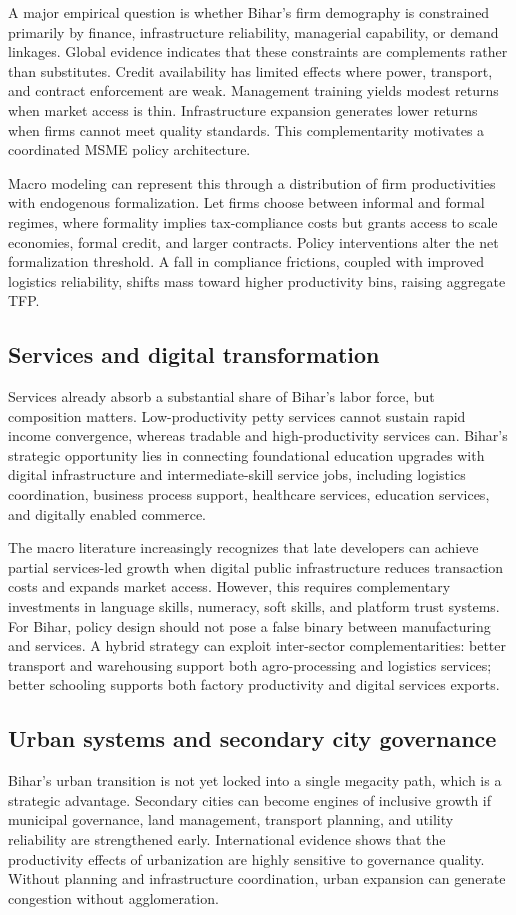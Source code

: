 \documentclass[preprint,12pt]{elsarticle}
\begin{document}
A major empirical question is whether Bihar's firm demography is constrained primarily by finance, infrastructure reliability, managerial capability, or demand linkages. Global evidence indicates that these constraints are complements rather than substitutes. Credit availability has limited effects where power, transport, and contract enforcement are weak. Management training yields modest returns when market access is thin. Infrastructure expansion generates lower returns when firms cannot meet quality standards. This complementarity motivates a coordinated MSME policy architecture.

Macro modeling can represent this through a distribution of firm productivities with endogenous formalization. Let firms choose between informal and formal regimes, where formality implies tax-compliance costs but grants access to scale economies, formal credit, and larger contracts. Policy interventions alter the net formalization threshold. A fall in compliance frictions, coupled with improved logistics reliability, shifts mass toward higher productivity bins, raising aggregate TFP.

\subsection{Services and digital transformation}
Services already absorb a substantial share of Bihar's labor force, but composition matters. Low-productivity petty services cannot sustain rapid income convergence, whereas tradable and high-productivity services can. Bihar's strategic opportunity lies in connecting foundational education upgrades with digital infrastructure and intermediate-skill service jobs, including logistics coordination, business process support, healthcare services, education services, and digitally enabled commerce.

The macro literature increasingly recognizes that late developers can achieve partial services-led growth when digital public infrastructure reduces transaction costs and expands market access. However, this requires complementary investments in language skills, numeracy, soft skills, and platform trust systems. For Bihar, policy design should not pose a false binary between manufacturing and services. A hybrid strategy can exploit inter-sector complementarities: better transport and warehousing support both agro-processing and logistics services; better schooling supports both factory productivity and digital services exports.

\subsection{Urban systems and secondary city governance}
Bihar's urban transition is not yet locked into a single megacity path, which is a strategic advantage. Secondary cities can become engines of inclusive growth if municipal governance, land management, transport planning, and utility reliability are strengthened early. International evidence shows that the productivity effects of urbanization are highly sensitive to governance quality. Without planning and infrastructure coordination, urban expansion can generate congestion without agglomeration.
\end{document}
